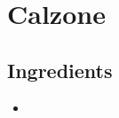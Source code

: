 \thispagestyle{fancy}
\section{Calzone}
\AddToShipoutPicture*{\Calzone}

\subsection*{Ingredients}
\begin{multicols}{3}
	\begin{itemize}
		\item 
	\end{itemize}
\end{multicols}